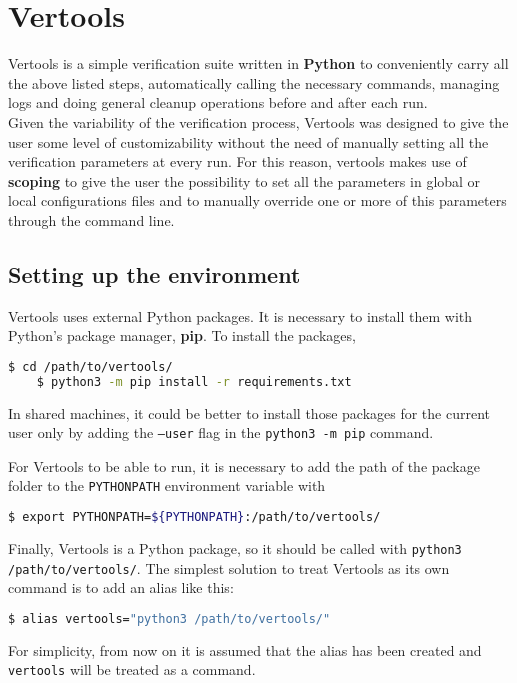 \section{Vertools}
Vertools is a simple verification suite written in \textbf{Python} to conveniently carry all the above listed steps, automatically calling the necessary commands, managing logs and doing general cleanup operations before and after each run.\\
Given the variability of the verification process, Vertools was designed to give the user some level of customizability without the need of manually setting all the verification parameters at every run. For this reason, vertools makes use of \textbf{scoping} to give the user the possibility to set all the parameters in global or local configurations files and to manually override one or more of this parameters through the command line.

\subsection{Setting up the environment}
Vertools uses external Python packages. It is necessary to install them with Python's package manager, \textbf{pip}. To install the packages,
\begin{lstlisting}[language=bash]
    $ cd /path/to/vertools/
    $ python3 -m pip install -r requirements.txt
\end{lstlisting}
In shared machines, it could be better to install those packages for the current user only by adding the \texttt{--user} flag in the \texttt{python3 -m pip} command.

For Vertools to be able to run, it is necessary to add the path of the package folder to the \texttt{PYTHONPATH} environment variable with
\begin{lstlisting}[language=bash]
    $ export PYTHONPATH=${PYTHONPATH}:/path/to/vertools/
\end{lstlisting}

Finally, Vertools is a Python package, so it should be called with \texttt{python3 /path/to/vertools/}. The simplest solution to treat Vertools as its own command is to add an alias like this:
\begin{lstlisting}[language=bash]
    $ alias vertools="python3 /path/to/vertools/"
\end{lstlisting}

For simplicity, from now on it is assumed that the alias has been created and \texttt{vertools} will be treated as a command.

